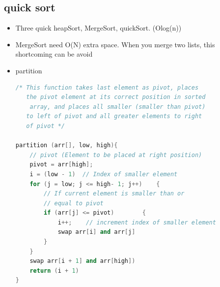\documentclass[a4paper,11pt,twoside]{book}
\begin{document}
\subsection{quick  sort}
\begin{itemize}
\item Three quick heapSort, MergeSort, quickSort. (Olog(n))
\item MergeSort need O(N) extra space. When you merge two lists, this shortcoming can be avoid

\item partition 
\begin{lstlisting}[frame=single, language=c++]
/* This function takes last element as pivot, places
   the pivot element at its correct position in sorted
    array, and places all smaller (smaller than pivot)
   to left of pivot and all greater elements to right
   of pivot */
   
partition (arr[], low, high){
    // pivot (Element to be placed at right position)
    pivot = arr[high];   
    i = (low - 1)  // Index of smaller element
    for (j = low; j <= high- 1; j++)    {
        // If current element is smaller than or
        // equal to pivot
        if (arr[j] <= pivot)        {
            i++;    // increment index of smaller element
            swap arr[i] and arr[j]
        }
    }
    swap arr[i + 1] and arr[high])
    return (i + 1)
}
\end{lstlisting}


\end{itemize}
\end{document}
